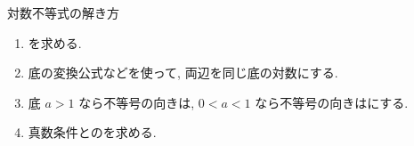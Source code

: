 \documentclass[14pt,dvipdfmx]{jsarticle}
\begin{document}
\begin{techniquebox}{対数不等式の解き方}
  \begin{enumerate}[label=\textbf{\arabic*}, leftmargin=1.5zw, itemsep=0.02em]
    \item {}を求める.
    \item 底の変換公式などを使って, 両辺を同じ底の対数にする.
    \item 底 $a>1$ なら不等号の向きは, $0<a<1$ なら不等号の向きはにする.
    \item 真数条件とのを求める.
  \end{enumerate}
\end{techniquebox}
\vspace{-0.5em}
\end{document}
